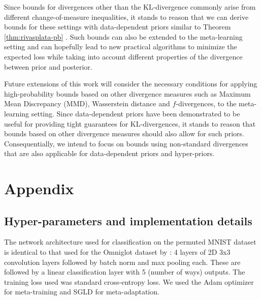 \documentclass{article}
\theoremstyle{definition}
\begin{document}
Since bounds for divergences other than the KL-divergence commonly arise from different change-of-measure inequalities, it stands to reason that we can derive bounds for these settings with data-dependent priors similar to Theorem \ref{thm:rivasplata-pb} \citep{Rivasplata2020}. Such bounds can also be extended to the meta-learning setting and can hopefully lead to new practical algorithms to minimize the expected loss while taking into account different properties of the divergence between prior and posterior.

Future extensions of this work will consider the necessary conditions for applying high-probability bounds based on other divergence measures such as Maximum Mean Discrepancy (MMD), Wasserstein distance and $f$-divergences, to the meta-learning setting. 
Since data-dependent priors have been demonstrated \citep{Dziugaite2017, Perez-Ortiz2021} to be useful for providing tight guarantees for KL-divergences, it stands to reason that bounds based on other divergence measures should also allow for such priors.
Consequentially, we intend to focus on bounds using non-standard divergences that are also applicable for data-dependent priors and hyper-priors.



\clearpage



\clearpage
\appendix
\section{Appendix}

\subsection{Hyper-parameters and implementation details} \label{append:hyper-params}

The network architecture used for classification on the permuted MNIST dataset is identical to that used for the Omniglot dataset by \citet{Vinyals2016}: 4 layers of 2D 3x3 convolution layers followed by batch norm and max pooling each. These are followed by a linear classification layer with 5 (number of ways) outputs. The training loss used was standard cross-entropy loss. We used the Adam optimizer for meta-training and SGLD for meta-adaptation.
\end{document}
